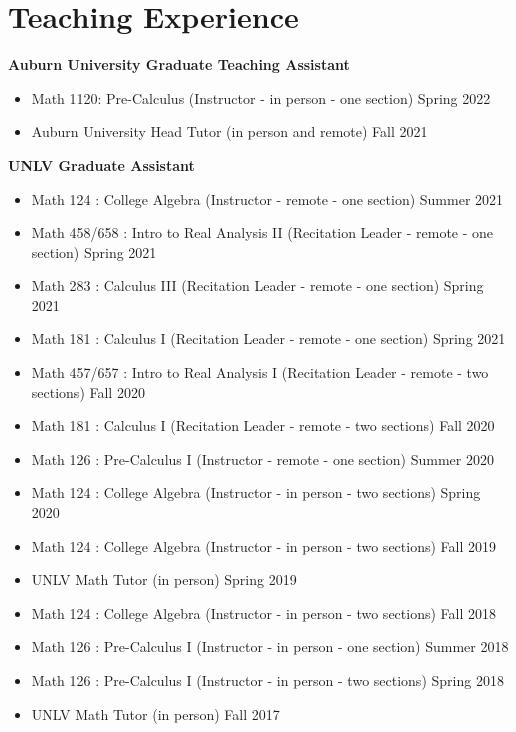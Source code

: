 \documentclass[letterpaper,12pt]{article}
\begin{document}
\section{Teaching Experience}

	
\noindent  \textbf{Auburn University Graduate Teaching Assistant} 
	
	\begin{itemize}[noitemsep,topsep=0pt]
		\item Math 1120: Pre-Calculus (Instructor - in person - one section) \hfill Spring 2022 
		\item Auburn University Head Tutor (in person and remote) \hfill Fall 2021
	\end{itemize}
\noindent \textbf{UNLV Graduate Assistant} 
	\begin{itemize}[noitemsep,topsep=0pt]
		\item Math 124 : College Algebra  (Instructor - remote - one section) \hfill Summer 2021
		\item Math 458/658 : Intro to Real Analysis II (Recitation Leader - remote - one section) \hfill Spring 2021
		\item Math 283 : Calculus III (Recitation Leader - remote - one section) \hfill Spring 2021
		\item Math 181 : Calculus I (Recitation Leader - remote - one section) \hfill Spring 2021
		\item Math 457/657 : Intro to Real Analysis I (Recitation Leader - remote - two sections) \hfill Fall 2020
		\item Math 181 : Calculus I (Recitation Leader - remote - two sections) \hfill Fall 2020
		\item Math 126 : Pre-Calculus I  (Instructor - remote - one section) \hfill Summer 2020
		\item Math 124 : College Algebra  (Instructor - in person - two sections) \hfill Spring 2020
		\item Math 124 : College Algebra  (Instructor - in person - two sections) \hfill Fall 2019
		\item UNLV Math Tutor (in person) \hfill Spring 2019
		\item Math 124 : College Algebra  (Instructor - in person - two sections) \hfill Fall 2018
		\item Math 126 : Pre-Calculus I  (Instructor - in person - one section) \hfill Summer 2018
		\item Math 126 : Pre-Calculus I  (Instructor - in person - two sections) \hfill Spring 2018
		\item UNLV Math Tutor (in person) \hfill Fall 2017
	\end{itemize}
	
\end{document}
